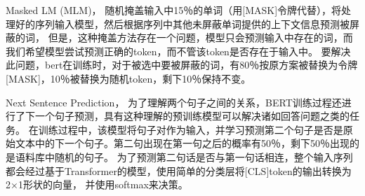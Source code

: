Masked LM (MLM)，
随机掩盖输入中15％的单词（用[MASK]令牌代替），将处理好的序列输入模型，然后根据序列中其他未屏蔽单词提供的上下文信息预测被屏蔽的词，
但是，这种掩盖方法存在一个问题，模型只会预测输入中存在的词，而我们希望模型尝试预测正确的token，而不管该token是否存在于输入中。
要解决此问题，bert在训练时，对于被选中要被屏蔽的词，有80％按原方案被替换为令牌[MASK]，10％被替换为随机token，剩下10％保持不变。

Next Sentence Prediction，
为了理解两个句子之间的关系，BERT训练过程还进行了下一个句子预测，具有这种理解的预训练模型可以解决诸如回答问题之类的任务。
在训练过程中，该模型将句子对作为输入，并学习预测第二个句子是否是原始文本中的下一个句子。第二句出现在第一句之后的概率有50％，剩下50％出现的是语料库中随机的句子。
为了预测第二句话是否与第一句话相连，整个输入序列都会经过基于Transformer的模型，使用简单的分类层将[CLS]token的输出转换为2×1形状的向量，
并使用softmax来决策。

